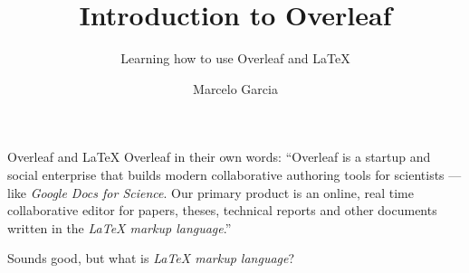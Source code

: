 \documentclass[aspectratio=169]{beamer}
\title{Introduction to Overleaf}
\subtitle{Learning how to use Overleaf and \LaTeX{}}
\author{Marcelo Garcia}
\institute{KAUST Library}
\date{}
\begin{document}
\begin{frame}
\titlepage
\end{frame}

%
%

%
%

\begin{frame}{Overleaf and \LaTeX{}}
Overleaf in their own words: ``Overleaf is a startup and social enterprise that builds modern collaborative authoring tools for scientists — like \textit{Google Docs for Science}. Our primary product is an online, real time collaborative editor for papers, theses, technical reports and other documents written in the \textit{LaTeX markup language}.''

Sounds good, but what is \emph{LaTeX markup language}?
\end{frame}
\end{document}
